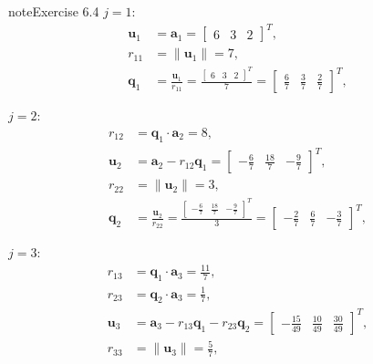 \documentclass[letterpaper,10pt,english]{jupyterBook}
\begin{document}
\begin{sphinxadmonition}{note}{Exercise 6.4}
\sphinxAtStartPar
\(j = 1\):
\begin{align*}
    \mathbf{u}_{1} &= \mathbf{a}_{1} = \left[\begin{matrix}6 & 3 & 2\end{matrix}\right]^T, \\
    r_{11} &= \| \mathbf{u}_{1} \| = 7, \\
    \mathbf{q}_{1} &= \frac{\mathbf{u}_{1}}{r_{11}} = \frac{\left[\begin{matrix}6 & 3 & 2\end{matrix}\right]^T}{7} = \left[\begin{matrix}\frac{6}{7} & \frac{3}{7} & \frac{2}{7}\end{matrix}\right]^T, \\
     \\
\end{align*}
\sphinxAtStartPar
\(j = 2\):
\begin{align*}
    r_{12} &= \mathbf{q}_{1} \cdot \mathbf{a}_{2} = 8, \\
    \mathbf{u}_{2} &= \mathbf{a}_{2} - r_{12} \mathbf{q}_{1} = \left[\begin{matrix}- \frac{6}{7} & \frac{18}{7} & - \frac{9}{7}\end{matrix}\right]^T, \\
    r_{22} &= \| \mathbf{u}_{2} \| = 3, \\
    \mathbf{q}_{2} &= \frac{\mathbf{u}_{2}}{r_{22}} = \frac{\left[\begin{matrix}- \frac{6}{7} & \frac{18}{7} & - \frac{9}{7}\end{matrix}\right]^T}{3} = \left[\begin{matrix}- \frac{2}{7} & \frac{6}{7} & - \frac{3}{7}\end{matrix}\right]^T, \\
     \\
\end{align*}
\sphinxAtStartPar
\(j = 3\):
\begin{align*}
    r_{13} &= \mathbf{q}_{1} \cdot \mathbf{a}_{3} = \frac{11}{7}, \\
    r_{23} &= \mathbf{q}_{2} \cdot \mathbf{a}_{3} = \frac{1}{7}, \\
    \mathbf{u}_{3} &= \mathbf{a}_{3} - r_{13} \mathbf{q}_{1} - r_{23} \mathbf{q}_{2} = \left[\begin{matrix}- \frac{15}{49} & \frac{10}{49} & \frac{30}{49}\end{matrix}\right]^T, \\
    r_{33} &= \| \mathbf{u}_{3} \| = \frac{5}{7}, \\

\end{align*}
\end{sphinxadmonition}
\end{document}
